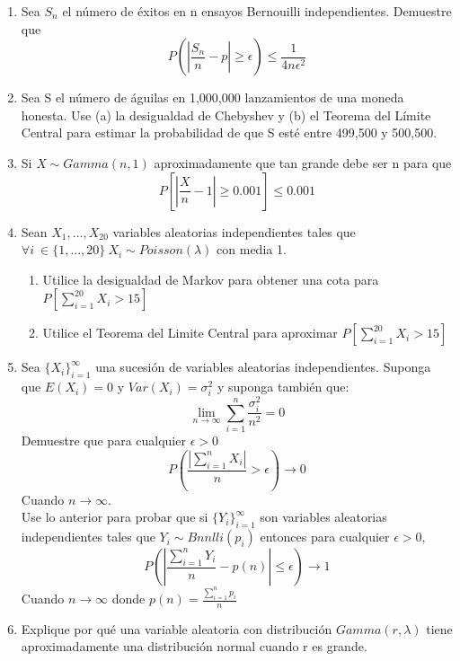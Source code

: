 \documentclass[11pt,a4paper]{report}
\begin{document}
\begin{enumerate}
		\item{
		Sea $S_{n}$ el número de éxitos en n ensayos Bernouilli independientes. Demuestre que $$P(|\frac{S_{n}}{n}-p|\geq \epsilon)\leq \frac{1}{4n\epsilon^2}$$
			
		}

		\item{
		Sea S el número de águilas en 1,000,000 lanzamientos de una moneda honesta. Use (a) la desigualdad de Chebyshev y (b) el Teorema del Límite Central para estimar la probabilidad de que S esté entre 499,500 y 500,500.
		}

		\item{
			
          Si $X \sim Gamma(n,1)$ aproximadamente que tan grande debe ser n para que 
          $$P[|\frac{X}{n}-1|\geq 0.001]\leq 0.001$$
		}

		\item{
			Sean $X_{1},...,X_{20}$ variables aleatorias independientes tales que $\forall i \ \in \lbrace 1,...,20 \rbrace \ X_{i} \sim Poisson(\lambda) $ con media 1.\\
			\begin{enumerate}
			    \item{Utilice la desigualdad de Markov para obtener una cota para $P[\sum_{i=1}^{20}X_{i}>15]$} 
			    \item{Utilice el Teorema del Limite Central para aproximar $P[\sum_{i=1}^{20}X_{i}>15]$}
			\end{enumerate}
		}

		\item{
	    Sea $\lbrace X_{i} \rbrace _{i=1}^{\infty}$ una sucesión de variables aleatorias independientes. Suponga que $E(X_{i})=0$ y $Var(X_{i})=\sigma_{i}^{2}$ y suponga también que:
	            $$\lim_{n \rightarrow \infty}\sum_{i=1}^{n}\frac{\sigma_{i}^{2}}{n^2}=0$$
	   Demuestre que para cualquier $\epsilon >0$
	                $$P(\frac{|\sum_{i=1}^{n}X_{i}|}{n}>\epsilon)\rightarrow 0$$
	   Cuando $n\rightarrow \infty$.\\
	   Use lo anterior para probar que si $\lbrace Y_{i} \rbrace_{i=1}^{\infty}$ son variables aleatorias independientes tales que $Y_{i}\sim Bnnlli(p_{i})$ entonces para cualquier $\epsilon>0$, 
	                $$P(|\frac{\sum_{i=1}^{n}Y_{i}}{n}-p(n)|\leq \epsilon)\rightarrow 1$$
	   Cuando $n\rightarrow \infty$ donde $p(n)=\frac{\sum_{i=1}^{n}p_{i}}{n}$
		}

		\item{
			Explique por qué una variable aleatoria con distribución $Gamma(r,\lambda)$ tiene aproximadamente una distribución normal cuando r es grande. 
		}

		
	\end{enumerate}
\end{document}
